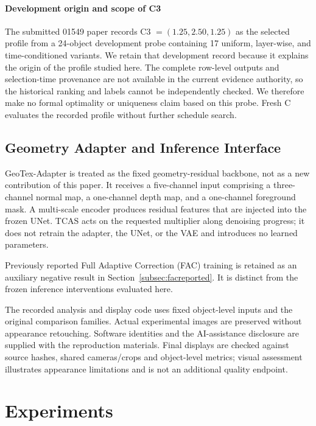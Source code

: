 \documentclass[times,twocolumn,final]{elsarticle}
\begin{document}
\paragraph{Development origin and scope of C3}
The submitted 01549 paper records C3 $=(1.25,2.50,1.25)$ as the selected profile from a 24-object development probe containing 17 uniform, layer-wise, and time-conditioned variants. We retain that development record because it explains the origin of the profile studied here. The complete row-level outputs and selection-time provenance are not available in the current evidence authority, so the historical ranking and labels cannot be independently checked. We therefore make no formal optimality or uniqueness claim based on this probe. Fresh C evaluates the recorded profile without further schedule search.

\subsection{Geometry Adapter and Inference Interface}
\label{subsec:adapterimpl}

GeoTex-Adapter is treated as the fixed geometry-residual backbone, not as a new contribution of this paper. It receives a five-channel input comprising a three-channel normal map, a one-channel depth map, and a one-channel foreground mask. A multi-scale encoder produces residual features that are injected into the frozen UNet. TCAS acts on the requested multiplier along denoising progress; it does not retrain the adapter, the UNet, or the VAE and introduces no learned parameters.

Previously reported Full Adaptive Correction (FAC) training is retained as an auxiliary negative result in Section~\ref{subsec:facreported}. It is distinct from the frozen inference interventions evaluated here.

The recorded analysis and display code uses fixed object-level inputs and the original comparison families. Actual experimental images are preserved without appearance retouching. Software identities and the AI-assistance disclosure are supplied with the reproduction materials. Final displays are checked against source hashes, shared cameras/crops and object-level metrics; visual assessment illustrates appearance limitations and is not an additional quality endpoint.

\section{Experiments}
\label{sec:experiments}
\end{document}
